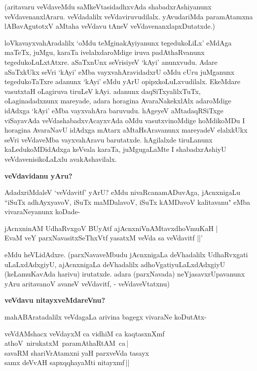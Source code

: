 \noindent
(aritavaru veVdaveMdu saMkeVtasidadhxvAda shabadxrAshiyanunx veVdavenanxlAraru. veVdadalilx veVdaviruvudilalx. yAvudariMda paramAtamxna lABavAgutotxV aMtaha veVdavu tAneV veVdavenanxlapxDutatxde.) 

loVkavayxvahAradalilx `oMdu teMginakAyiyanunx tegedukoLiLx' eMdAga maTeTx, juMgu, karaTa ivelalxdaroMdige iruva padAthaRvanunx tegedukoLuLxtAtxre. aSaTxnUnx seVrisiyeV `kAyi' anunxvudu. Adare aSaTxkUkx seVri `kAyi' eMba vayxvahAravidadxrU oMdu cUru juMganunx tegedukoTaTxre adanunx `kAyi' eMdu yArU opipxkoLuLxvudilalx. EkeMdare vasutxtaH oLagiruva tiruLeV kAyi. adanunx daqSiTxyalilxTuTx, oLaginadadxnunx mareyade, adara horagina AvaraNakekxlAlx adaroMdige idAdxga `kAyi' eMba vayxvahAra baruvudu. hAgeyeV aMtadaqRSiTxge viSayavAda veVdashabadxvAcayxvAda oMdu vasutxvinoMdige hoMdikoMDu I horagina AvaraNavU idAdxga mAtarx aMtaHsAravanunx mareyadeV elalxkUkx seVri veVdaveMba vayxvahAravu barutatxde. hAgilalxde tiruLanunx kaLedukoMDidAdxga keVvala karaTa, juMgugaLaMte I shabadxrAshiyU veVdavenisikoLaLxlu avakAshavilalx.

{\bigskip
\noindent
{\large\bf veVdavidanu yAru?}}\label{page133}
\medskip

\noindent
AdadxriMdaleV `veVdavitf' yArU? eMdu nivaRcanamADuvAga, jAcnxnigaLu ``iSuTx adhAyxyavoV, iSuTx maMDalavoV, iSuTx kAMDavoV kalitavanu" eMba vivaraNeyanunx koDade-

\begin{shloka}
jAcnxninAM UdhaRvxgoV BUyAtf ajAcnxniVnAMtavxdhoVmuKaH |\\\label{133}
EvaM veY parxNavasitxSeThxVtf yasatxM veVda sa veVdavitf ||'
\end{shloka}

\noindent
eMdu heVLidAdxre. (parxNavaveMbudu jAcnxnigaLa deVhadalilx UdhaRvxgati uLaLxdAdxgiyU, ajAcnxnigaLa deVhadalilx adhoVgatiyuLaLxdAdxgiyU (keLamuKavAda harivu) irutatxde. adara (parxNavada) neYjasavxrUpavanunx yAru aritavanoV avaneV veVdavitf, - veVdaveVtatxnu)

{\bigskip
\noindent
{\large\bf veVdavu nitayxveMdareVnu?}}\label{page133a}
\medskip

\noindent
mahABAratadalilx veVdagaLa arivina bagegx vivaraNe koDutAtx-

\begin{shloka}
veVdAMshacx veVdayxM ca vidhiM ca kaqtasxnXmf \hbox{athoV nirukatxM paramAthaRtAM ca\,|}\\\label{133a}
savaRM shariVrAtamxni yaH parxveVda tasayx\\
samx deVvAH sapxqqhayaMti nitayxmf\,||
\end{shloka}

